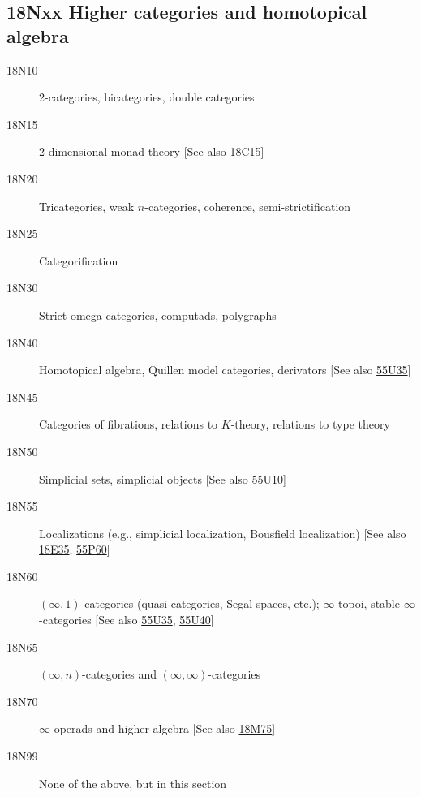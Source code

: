 \subsection*{18Nxx Higher categories and homotopical algebra}\label{18Nxx}
\begin{description} 
\item [18N10]\label{18N10} 2-categories, bicategories, double categories
\item [18N15]\label{18N15} 2-dimensional monad theory [See also \hyperref[18C15]{18C15}]
\item [18N20]\label{18N20} Tricategories, weak $n$-categories, coherence, semi-strictification
\item [18N25]\label{18N25} Categorification
\item [18N30]\label{18N30} Strict omega-categories, computads, polygraphs
\item [18N40]\label{18N40} Homotopical algebra, Quillen model categories, derivators [See also \hyperref[55U35]{55U35}]
\item [18N45]\label{18N45} Categories of fibrations, relations to $K$-theory, relations to type theory
\item [18N50]\label{18N50} Simplicial sets, simplicial objects [See also \hyperref[55U10]{55U10}]
\item [18N55]\label{18N55} Localizations (e.g., simplicial localization, Bousfield localization) [See also \hyperref[18E35]{18E35}, \hyperref[55P60]{55P60}]
\item [18N60]\label{18N60} $(\infty,1)$-categories (quasi-categories, Segal spaces, etc.); $\infty$-topoi, stable $\infty$-categories [See also \hyperref[55U35]{55U35}, \hyperref[55U40]{55U40}]
\item [18N65]\label{18N65} $(\infty, n)$-categories and $(\infty,\infty)$-categories
\item [18N70]\label{18N70} $\infty$-operads and higher algebra [See also \hyperref[18M75]{18M75}]
\item [18N99]\label{18N99} None of the above, but in this section
\end{description}
